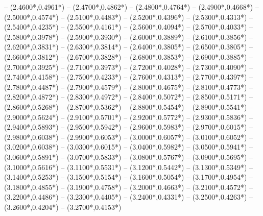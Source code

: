 {	-- ({2.4600*\dx},{0.4961*\dy})
	-- ({2.4700*\dx},{0.4862*\dy})
	-- ({2.4800*\dx},{0.4764*\dy})
	-- ({2.4900*\dx},{0.4668*\dy})
	-- ({2.5000*\dx},{0.4574*\dy})
	-- ({2.5100*\dx},{0.4483*\dy})
	-- ({2.5200*\dx},{0.4396*\dy})
	-- ({2.5300*\dx},{0.4313*\dy})
	-- ({2.5400*\dx},{0.4235*\dy})
	-- ({2.5500*\dx},{0.4161*\dy})
	-- ({2.5600*\dx},{0.4094*\dy})
	-- ({2.5700*\dx},{0.4033*\dy})
	-- ({2.5800*\dx},{0.3978*\dy})
	-- ({2.5900*\dx},{0.3930*\dy})
	-- ({2.6000*\dx},{0.3889*\dy})
	-- ({2.6100*\dx},{0.3856*\dy})
	-- ({2.6200*\dx},{0.3831*\dy})
	-- ({2.6300*\dx},{0.3814*\dy})
	-- ({2.6400*\dx},{0.3805*\dy})
	-- ({2.6500*\dx},{0.3805*\dy})
	-- ({2.6600*\dx},{0.3812*\dy})
	-- ({2.6700*\dx},{0.3828*\dy})
	-- ({2.6800*\dx},{0.3853*\dy})
	-- ({2.6900*\dx},{0.3885*\dy})
	-- ({2.7000*\dx},{0.3925*\dy})
	-- ({2.7100*\dx},{0.3973*\dy})
	-- ({2.7200*\dx},{0.4028*\dy})
	-- ({2.7300*\dx},{0.4090*\dy})
	-- ({2.7400*\dx},{0.4158*\dy})
	-- ({2.7500*\dx},{0.4233*\dy})
	-- ({2.7600*\dx},{0.4313*\dy})
	-- ({2.7700*\dx},{0.4397*\dy})
	-- ({2.7800*\dx},{0.4487*\dy})
	-- ({2.7900*\dx},{0.4579*\dy})
	-- ({2.8000*\dx},{0.4675*\dy})
	-- ({2.8100*\dx},{0.4773*\dy})
	-- ({2.8200*\dx},{0.4872*\dy})
	-- ({2.8300*\dx},{0.4972*\dy})
	-- ({2.8400*\dx},{0.5072*\dy})
	-- ({2.8500*\dx},{0.5171*\dy})
	-- ({2.8600*\dx},{0.5268*\dy})
	-- ({2.8700*\dx},{0.5362*\dy})
	-- ({2.8800*\dx},{0.5454*\dy})
	-- ({2.8900*\dx},{0.5541*\dy})
	-- ({2.9000*\dx},{0.5624*\dy})
	-- ({2.9100*\dx},{0.5701*\dy})
	-- ({2.9200*\dx},{0.5772*\dy})
	-- ({2.9300*\dx},{0.5836*\dy})
	-- ({2.9400*\dx},{0.5893*\dy})
	-- ({2.9500*\dx},{0.5942*\dy})
	-- ({2.9600*\dx},{0.5983*\dy})
	-- ({2.9700*\dx},{0.6015*\dy})
	-- ({2.9800*\dx},{0.6038*\dy})
	-- ({2.9900*\dx},{0.6053*\dy})
	-- ({3.0000*\dx},{0.6057*\dy})
	-- ({3.0100*\dx},{0.6052*\dy})
	-- ({3.0200*\dx},{0.6038*\dy})
	-- ({3.0300*\dx},{0.6015*\dy})
	-- ({3.0400*\dx},{0.5982*\dy})
	-- ({3.0500*\dx},{0.5941*\dy})
	-- ({3.0600*\dx},{0.5891*\dy})
	-- ({3.0700*\dx},{0.5833*\dy})
	-- ({3.0800*\dx},{0.5767*\dy})
	-- ({3.0900*\dx},{0.5695*\dy})
	-- ({3.1000*\dx},{0.5616*\dy})
	-- ({3.1100*\dx},{0.5531*\dy})
	-- ({3.1200*\dx},{0.5442*\dy})
	-- ({3.1300*\dx},{0.5349*\dy})
	-- ({3.1400*\dx},{0.5253*\dy})
	-- ({3.1500*\dx},{0.5154*\dy})
	-- ({3.1600*\dx},{0.5054*\dy})
	-- ({3.1700*\dx},{0.4954*\dy})
	-- ({3.1800*\dx},{0.4855*\dy})
	-- ({3.1900*\dx},{0.4758*\dy})
	-- ({3.2000*\dx},{0.4663*\dy})
	-- ({3.2100*\dx},{0.4572*\dy})
	-- ({3.2200*\dx},{0.4486*\dy})
	-- ({3.2300*\dx},{0.4405*\dy})
	-- ({3.2400*\dx},{0.4331*\dy})
	-- ({3.2500*\dx},{0.4263*\dy})
	-- ({3.2600*\dx},{0.4204*\dy})
	-- ({3.2700*\dx},{0.4153*\dy})
}
